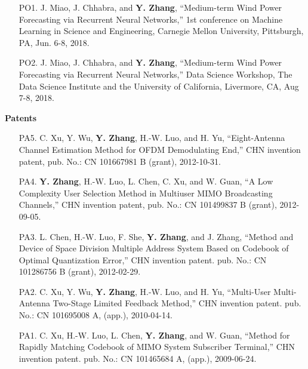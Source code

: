 \documentclass[margin,line]{res}
\begin{document}
\begin{resume}
\begin{enumerate}
\item[PO1.] J. Miao, J. Chhabra, and \textbf{Y. Zhang}, ``Medium-term Wind Power Forecasting via Recurrent Neural Networks,''
1st conference on Machine Learning in Science and Engineering, Carnegie Mellon University, Pittsburgh, PA, Jun. 6-8, 2018.

\item[PO2.] J. Miao, J. Chhabra, and \textbf{Y. Zhang}, ``Medium-term Wind Power Forecasting via Recurrent Neural Networks,''
Data Science Workshop, The Data Science Institute and the University of California, Livermore, CA, Aug 7-8, 2018.
\end{enumerate}

\vspace{.2cm}




{\bf Patents}

\vspace{.2cm}

\begin{enumerate}


\item[PA5.] C. Xu, Y. Wu, \textbf{Y. Zhang}, H.-W. Luo, and H. Yu,
``Eight-Antenna Channel Estimation Method for OFDM Demodulating End,'' CHN invention patent,
pub. No.: CN 101667981 B (grant), 2012-10-31.

\item[PA4.] \textbf{Y. Zhang}, H.-W. Luo, L. Chen, C. Xu, and W. Guan,
``A Low Complexity User Selection Method in Multiuser MIMO Broadcasting Channels,'' CHN invention patent,
pub. No.: CN 101499837 B (grant), 2012-09-05.


\item[PA3.] L. Chen, H.-W. Luo, F. She, \textbf{Y. Zhang}, and J. Zhang,
``Method and Device of Space Division Multiple Address System Based on Codebook
of Optimal Quantization Error,'' CHN invention patent.
pub. No.: CN 101286756 B (grant), 2012-02-29.


\item[PA2.] C. Xu, Y. Wu, \textbf{Y. Zhang}, H.-W. Luo, and H. Yu,
``Multi-User Multi-Antenna Two-Stage Limited Feedback Method,'' CHN invention patent.
pub. No.: CN 101695008 A, (app.), 2010-04-14.


\item[PA1.] C. Xu, H.-W. Luo, L. Chen, \textbf{Y. Zhang}, and W. Guan,
``Method for Rapidly Matching Codebook of MIMO System Subscriber Terminal,'' CHN invention patent.
pub. No.: CN 101465684 A, (app.), 2009-06-24.



\end{enumerate}
\end{resume}
\end{document}
